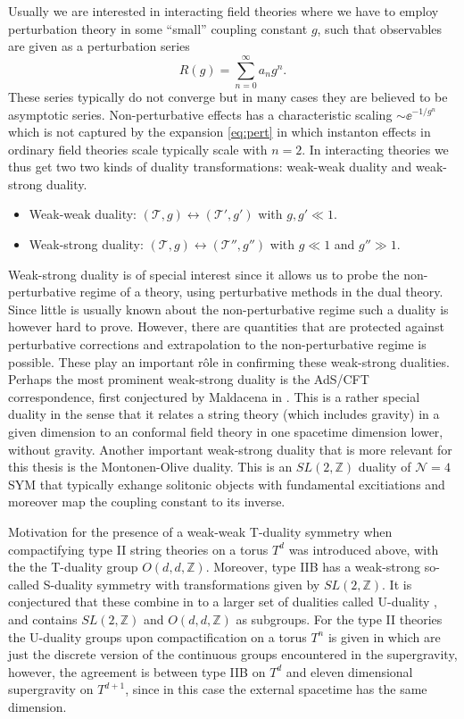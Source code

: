 Usually we are interested in interacting field theories where we have to employ perturbation theory in some ``small'' coupling constant $g$, such that observables are given as a perturbation series
\begin{equation}\label{eq:pert}
    R(g) = \sum_{n=0}^{\infty}a_n g^n.
\end{equation}
These series typically do not converge but in many cases they are believed to be asymptotic series. Non-perturbative effects has a characteristic scaling $\sim \ee^{-1/g^n}$ which is not captured by the expansion \eqref{eq:pert} in which instanton effects in ordinary field theories scale typically scale with $n=2$. In interacting theories we thus get two two kinds of duality transformations: weak-weak duality and weak-strong duality. 
\begin{itemize}
    \item Weak-weak duality: $\left(\mathscr{T},g\right)\leftrightarrow\left(\mathscr{T}',g'\right)$ with $g,g'\ll 1$.
    \item Weak-strong duality: $\left(\mathscr{T},g\right)\leftrightarrow\left(\mathscr{T}'',g''\right)$ with $g\ll 1$ and $g''\gg 1$.
\end{itemize}
Weak-strong duality is of special interest since it allows us to probe the non-perturbative regime of a theory, using perturbative methods in the dual theory. Since little is usually known about the non-perturbative regime such a duality is however hard to prove. However, there are quantities that are protected against perturbative corrections and extrapolation to the non-perturbative regime is possible. These play an important rôle in confirming these weak-strong dualities. Perhaps the most prominent weak-strong duality is the AdS/CFT correspondence, first conjectured by Maldacena in \cite{Maldacena1999}. This is a rather special duality in the sense that it relates a string theory (which includes gravity) in a given dimension to an conformal field theory in one spacetime dimension lower, without gravity. Another important weak-strong duality that is more relevant for this thesis is the Montonen-Olive duality. This is an $SL(2,\mathbb{Z})$ duality of $\mathcal{N}=4$ SYM that typically exhange solitonic objects with fundamental excitiations and moreover map the coupling constant to its inverse. 

Motivation for the presence of a weak-weak T-duality symmetry when compactifying type II string theories on a torus $T^d$ was introduced above, with the the T-duality group $O(d,d,\mathbb{Z})$. Moreover, type IIB has a weak-strong so-called S-duality symmetry with transformations given by $SL(2,\mathbb{Z})$. It is conjectured that these combine in to a larger set of dualities called U-duality \cite{Hull:1994ys}, and contains $SL(2,\mathbb{Z})$ and $O(d,d,\mathbb{Z})$ as subgroups. For the type II theories the U-duality groups upon compactification on a torus $T^{n}$ is given in  which are just the discrete version of the continuous groups encountered in the supergravity, however, the agreement is between type IIB on $T^{d}$ and eleven dimensional supergravity on $T^{d+1}$, since in this case the external spacetime has the same dimension. 

